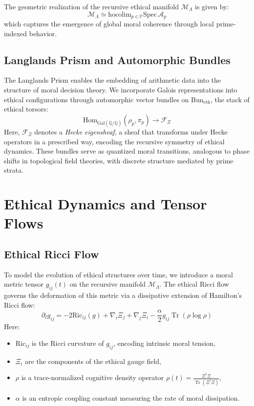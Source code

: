\documentclass{article}
\theoremstyle{plain}
\theoremstyle{claimstyle}
\begin{document}
The geometric realization of the recursive ethical manifold $\mathcal{M}_\Lambda$ is given by:
\[
\mathcal{M}_\Lambda \simeq \mathrm{hocolim}_{p \in \mathbb{P}} \mathrm{Spec}\, \mathcal{A}_p
\]
which captures the emergence of global moral coherence through local prime-indexed behavior.

\subsection{Langlands Prism and Automorphic Bundles}

The Langlands Prism enables the embedding of arithmetic data into the structure of moral decision theory. We incorporate Galois representations into ethical configurations through automorphic vector bundles on $\mathrm{Bun}_{\mathrm{eth}}$, the stack of ethical torsors:
\[
\mathrm{Hom}_{\mathrm{Gal}(\overline{\mathbb{Q}}/\mathbb{Q})}(\rho_p, \pi_p) \longrightarrow \mathcal{F}_\Xi
\]
Here, $\mathcal{F}_\Xi$ denotes a \textit{Hecke eigensheaf}, a sheaf that transforms under Hecke operators in a prescribed way, encoding the recursive symmetry of ethical dynamics. These bundles serve as quantized moral transitions, analogous to phase shifts in topological field theories, with discrete structure mediated by prime strata.

\section{Ethical Dynamics and Tensor Flows}

\subsection{Ethical Ricci Flow}

To model the evolution of ethical structures over time, we introduce a moral metric tensor $g_{ij}(t)$ on the recursive manifold $\mathcal{M}_\Lambda$. The ethical Ricci flow governs the deformation of this metric via a dissipative extension of Hamilton's Ricci flow:
\[
\partial_t g_{ij} = -2 \mathrm{Ric}_{ij}(g) + \nabla_i \Xi_j + \nabla_j \Xi_i - \frac{\alpha}{2} g_{ij} \operatorname{Tr}(\rho \log \rho)
\]
Here:
\begin{itemize}
    \item $\mathrm{Ric}_{ij}$ is the Ricci curvature of $g_{ij}$, encoding intrinsic moral tension,
    \item $\Xi_i$ are the components of the ethical gauge field,
    \item $\rho$ is a trace-normalized cognitive density operator $\rho(t) = \frac{\Xi^\dagger \Xi}{\operatorname{Tr}(\Xi^\dagger \Xi)}$,
    \item $\alpha$ is an entropic coupling constant measuring the rate of moral dissipation.
\end{itemize}
\end{document}

